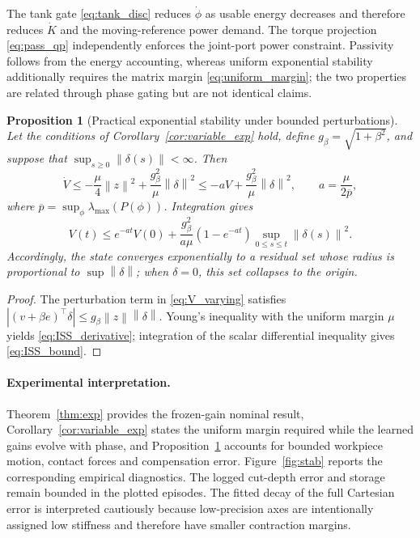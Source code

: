 \documentclass[11pt,a4paper]{article}
\newtheorem{proposition}{Proposition}
\newcommand{\norm}[1]{\left\lVert#1\right\rVert}
\begin{document}
The tank gate \eqref{eq:tank_disc} reduces $\dot\phi$ as usable energy
decreases and therefore reduces $\dot K$ and the moving-reference power demand.
The torque projection \eqref{eq:pass_qp} independently enforces the joint-port
power constraint. Passivity follows from the energy accounting, whereas
uniform exponential stability additionally requires the matrix margin
\eqref{eq:uniform_margin}; the two properties are related through phase gating
but are not identical claims.

\begin{proposition}[Practical exponential stability under bounded perturbations]
\label{prop:practical_exp}
Let the conditions of Corollary~\ref{cor:variable_exp} hold, define
$g_\beta=\sqrt{1+\beta^2}$, and suppose that
$\sup_{s\ge0}\norm{\delta(s)}<\infty$. Then
\begin{equation}
\dot V
\le-\frac{\mu}{4}\norm{z}^2
+\frac{g_\beta^2}{\mu}\norm{\delta}^2
\le-aV+\frac{g_\beta^2}{\mu}\norm{\delta}^2,
\qquad
a=\frac{\mu}{2\overline p},
\label{eq:ISS_derivative}
\end{equation}
where $\overline p=\sup_\phi\lambda_{\max}(P(\phi))$. Integration gives
\begin{equation}
V(t)\le e^{-at}V(0)
+\frac{g_\beta^2}{a\mu}
 \left(1-e^{-at}\right)
 \sup_{0\le s\le t}\norm{\delta(s)}^2 .
\label{eq:ISS_bound}
\end{equation}
Accordingly, the state converges exponentially to a residual set whose radius
is proportional to $\sup\norm{\delta}$; when $\delta=0$, this set collapses to
the origin.
\end{proposition}
\begin{proof}
The perturbation term in \eqref{eq:V_varying} satisfies
$|(v+\beta e)^\top\delta|
\le g_\beta\norm{z}\norm{\delta}$. Young's inequality with the uniform margin
$\mu$ yields \eqref{eq:ISS_derivative}; integration of the scalar differential
inequality gives \eqref{eq:ISS_bound}.
\end{proof}

\paragraph{Experimental interpretation.}
Theorem~\ref{thm:exp} provides the frozen-gain nominal result,
Corollary~\ref{cor:variable_exp} states the uniform margin required while the
learned gains evolve with phase, and Proposition~\ref{prop:practical_exp}
accounts for bounded workpiece motion, contact forces and compensation error.
Figure~\ref{fig:stab} reports the corresponding empirical diagnostics. The
logged cut-depth error and storage remain bounded in the plotted episodes. The fitted decay
of the full Cartesian error is interpreted cautiously because low-precision
axes are intentionally assigned low stiffness and therefore have smaller
contraction margins.
\end{document}
